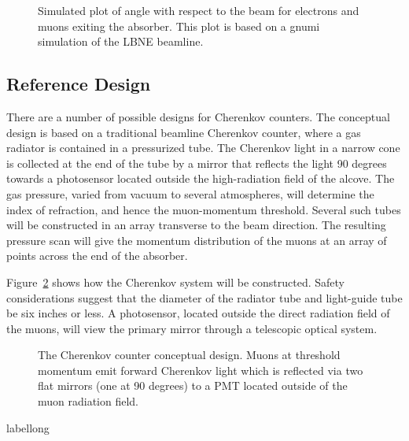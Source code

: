 \begin{figure}[htbp]
\begin{center}
\caption[Simulated electron and muon angles upon exiting absorber]{Simulated plot of angle with respect to the beam for 
electrons and muons exiting the absorber.
This plot is based on a gnumi simulation of the LBNE beamline.}
\label{fig:MuonAngle}
\end{center}
\end{figure}


\subsection{Reference Design}

There are a number of possible designs for Cherenkov counters. The
conceptual design is based on a traditional beamline Cherenkov
counter, where a gas radiator is contained in a pressurized tube. The
Cherenkov light in a narrow cone is collected at the end of the tube
by a mirror that reflects the light 90 degrees towards a photosensor
located outside the high-radiation field of the alcove. The gas
pressure, varied from vacuum to several atmospheres, will determine
the index of refraction, and hence the muon-momentum
threshold. Several such tubes will be constructed in an array
transverse to the beam direction. The resulting pressure scan will
give the momentum distribution of the muons at an array of points
across the end of the absorber.  

Figure~\ref{fig:CherenkovCounterDetail} shows how the
Cherenkov system will 
be constructed. Safety considerations suggest that the
diameter of the radiator tube and light-guide tube be six inches
or less.  A 
photosensor, located outside the direct radiation field of the muons, will
view the primary mirror through a telescopic optical system.

\begin{figure}[htbp]
\begin{center}
\caption[Cherenkov counter design]{ The Cherenkov counter conceptual design. 
Muons at threshold momentum emit forward Cherenkov light which is
reflected via two flat mirrors (one at 90 degrees) 
to a PMT located outside of the muon
radiation field. }
\label{fig:CherenkovCounterDetail}
\end{center}
\end{figure}
\begin{cdrfigure}[short]{label}{long}
\end{cdrfigure}

